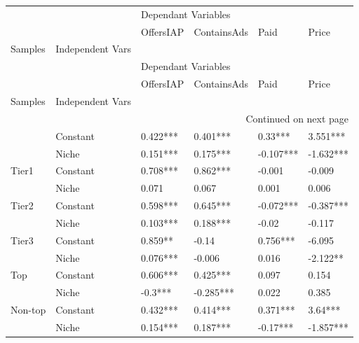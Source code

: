 \begin{longtable}[h!]{llllll}
\toprule
        &       & \multicolumn{4}{l}{Dependant Variables} \\
        &       &           OffersIAP & ContainsAds &       Paid &      Price \\
Samples & Independent Vars &                     &             &            &            \\
\midrule
\endfirsthead

\toprule
        &       & \multicolumn{4}{l}{Dependant Variables} \\
        &       &           OffersIAP & ContainsAds &       Paid &      Price \\
Samples & Independent Vars &                     &             &            &            \\
\midrule
\endhead
\midrule
\multicolumn{6}{r}{{Continued on next page}} \\
\midrule
\endfoot

\bottomrule
\endlastfoot
\multirow{2}{*}{Full} & Constant &            0.422*** &    0.401*** &    0.33*** &   3.551*** \\
        & Niche &            0.151*** &    0.175*** &  -0.107*** &  -1.632*** \\
\cline{1-6}
\multirow{2}{*}{Tier1} & Constant &            0.708*** &    0.862*** &     -0.001 &     -0.009 \\
        & Niche &               0.071 &       0.067 &      0.001 &      0.006 \\
\cline{1-6}
\multirow{2}{*}{Tier2} & Constant &            0.598*** &    0.645*** &  -0.072*** &  -0.387*** \\
        & Niche &            0.103*** &    0.188*** &      -0.02 &     -0.117 \\
\cline{1-6}
\multirow{2}{*}{Tier3} & Constant &             0.859** &       -0.14 &   0.756*** &     -6.095 \\
        & Niche &            0.076*** &      -0.006 &      0.016 &   -2.122** \\
\cline{1-6}
\multirow{2}{*}{Top} & Constant &            0.606*** &    0.425*** &      0.097 &      0.154 \\
        & Niche &             -0.3*** &   -0.285*** &      0.022 &      0.385 \\
\cline{1-6}
\multirow{2}{*}{Non-top} & Constant &            0.432*** &    0.414*** &   0.371*** &    3.64*** \\
        & Niche &            0.154*** &    0.187*** &   -0.17*** &  -1.857*** \\
\end{longtable}
